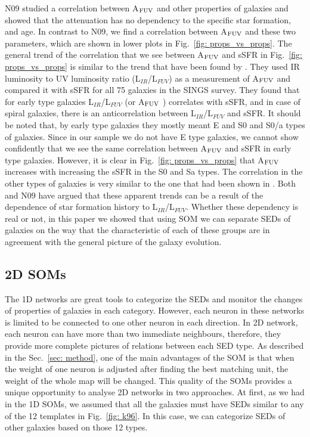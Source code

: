         N09 studied a correlation between A$_{\rm {FUV}}$ and other properties of galaxies and showed that the attenuation has no dependency to the specific star formation, and age.
        In contrast to N09, we find a correlation between A$_{\rm {FUV}}$ and these two parameters, which are shown in lower plots in Fig.~\ref{fig: props_vs_props}.
        The general trend of the correlation that we see between A$_{\rm {FUV}}$ and sSFR in Fig.~\ref{fig: props_vs_props} is similar to the trend that have been found by \cite{Dale07}.
        They used IR luminosity to UV luminosity ratio (L$_{IR}$/L$_{FUV}$) as a measurement of A$_{\rm {FUV}}$ and compared it with sSFR for all 75 galaxies in the SINGS survey.
        They found that for early type galaxies L$_{IR}$/L$_{FUV}$ (or A$_{\rm {FUV}}$ ) correlates with sSFR, and in case of spiral galaxies, there is an anticorrelation between L$_{IR}$/L$_{FUV}$ and sSFR.
        It should be noted that, by early type galaxies they mostly meant E and S0 and S0/a types of galaxies.
        Since in our sample we do not have E type galaxies, we cannot show confidently that we see the same correlation between A$_{\rm {FUV}}$ and sSFR in early type galaxies. 
        However, it is clear in Fig.~\ref{fig: props_vs_props} that A$_{\rm {FUV}}$ increases with increasing the sSFR in the S0 and Sa types.
        The correlation in the other types of galaxies is very similar to the one that had been shown in \cite{Dale07}.
        Both \cite{Dale07} and N09 have argued that these apparent trends can be a result of the dependence of star formation history to L$_{IR}$/L$_{FUV}$.
        Whether these dependency is real or not, in this paper we showed that using SOM we can separate SEDs of galaxies on the way that the characteristic of each of these groups are in agreement with the general picture of the galaxy evolution.
        
        
    \subsection{2D SOMs}
    \label{sec: 2D}
    The 1D networks are great tools to categorize the SEDs and monitor the changes of properties of galaxies in each category.
    However, each neuron in these networks is limited to be connected to one other neuron in each direction.
    In 2D network, each neuron can have more than two immediate neighbours, therefore, they provide more complete pictures of relations between each SED type.
    As described in the Sec.~\ref{sec: method}, one of the main advantages of the SOM is that when the weight of one neuron is adjusted after finding the best matching unit, the weight of the whole map will be changed.
    This quality of the SOMs provides a unique opportunity to analyse 2D networks in two approaches. 
    At first, as we had in the 1D SOMs, we assumed that all the galaxies must have SEDs similar to any of the 12 templates in Fig.~\ref{fig: k96}.
    In this case, we can categorize SEDs of other galaxies based on those 12 types.
    
